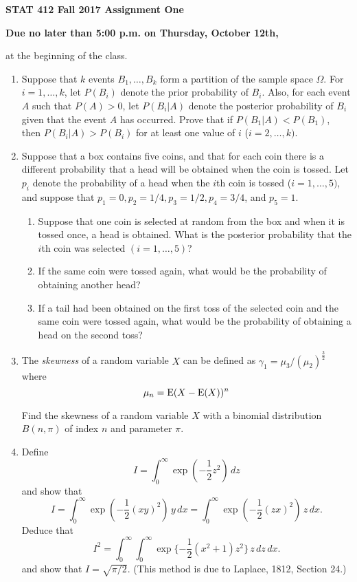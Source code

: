\documentclass[12pt]{article}
\newcommand{\half}{\mbox{$\frac{1}{2}$}}
\begin{document}
\begin{center}
{\large\bf STAT 412 Fall 2017 Assignment One}\\
{\bf Due no later than 5:00 p.m. on Thursday, October 12th,

at the beginning of the class.}
\end{center}

\begin{enumerate}

\item Suppose that $k$ events $B_1,\ldots,B_k$ form a partition of the sample space $\Omega$. For $i=1,\ldots,k$, let $P(B_i)$ denote the prior probability of $B_i$. Also, for each event $A$ such that $P(A)>0$, let $P(B_i |A)$ denote the posterior probability of $B_i$ given that the event $A$ has occurred. Prove that if $P(B_1|A) < P(B_1)$, then $P(B_i|A) > P(B_i)$ for at least one value of $i$ ($i=2,\ldots,k)$.

\item Suppose that a box contains five coins, and that for each coin there is a different probability that a head will be obtained when the coin is tossed. Let $p_i$ denote the probability of a head when the $i$th coin is tossed ($i=1,\ldots,5)$, and suppose that $p_1=0,p_2=1/4,p_3=1/2,p_4=3/4$, and $p_5=1$.

\begin{enumerate}
\item Suppose that one coin is selected at random from the box and when it is tossed once, a head is obtained. What is the posterior probability that the $i$th coin was selected $(i=1,\ldots,5)$?
\item If the same coin were tossed again, what would be the probability of obtaining another head?
\item If a tail had been obtained on the first toss of the selected coin and the same coin were tossed again,
what would be the probability of obtaining a head on the second toss?
\end{enumerate}


\item  The \textit{skewness} of a random variable $X$ can be defined as  
     $\gamma_1 = \mu_3/(\mu_2)^{\frac{3}{2}}$ where
\[               \mu_n  =  {\rm E} (X  -  {\rm E} (X))^n \]
    
     Find the skewness of a random variable $X$ with a binomial
     distribution $B(n, \pi)$ of index $n$ and parameter $\pi$.
     

\item Define
\[ I=\int_{0}^{\infty}\exp(-\half z^2)\,dz \]
     and show 
		that 
\[ I=\int_{0}^{\infty}\exp(-\half(xy)^2)\,y\,dx
    =\int_{0}^{\infty}\exp(-\half(zx)^2)\,z\,dx. \]
     Deduce that
\[ I^2=\int_{0}^{\infty}\int_{0}^{\infty}
        \exp\{-\half(x^2+1)z^2\}\,z\,dz\,dx.             \]
   and %
	show that $I=\sqrt{\pi/2}$.
	(This method is due to Laplace, 1812, 
     Section 24.)



\end{enumerate}
\end{document}
